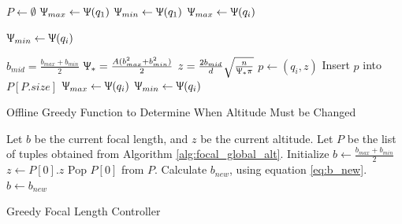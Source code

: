 \documentclass[conference]{IEEEtran}
\theoremstyle{plain}%
\begin{document}
\begin{algorithm}
\begin{algorithmic}[1]

\STATE $P \leftarrow \emptyset$ 
\STATE $\Uppsi_{max} \leftarrow \Uppsi(q_1)$ 
\STATE $\Uppsi_{min} \leftarrow \Uppsi(q_1)$
\STATE $\Uppsi_{max} \leftarrow \Uppsi(q_i)$
\ENDIF

\STATE $\Uppsi_{min} \leftarrow \Uppsi(q_i)$
\ENDIF

\STATE $b_{mid} = \frac{b_{max}+b_{min}}{2}$
\STATE $\Uppsi_* = \frac{A(b_{max}^2+b_{min}^2)}{2}$
\STATE $z = \frac{2b_{mid}}{d} \sqrt{\frac{n}{\Uppsi_*\pi}}$ 
\STATE $p \leftarrow (q_i, z)$
\STATE Insert $p$ into $P[P.size]$
\STATE $\Uppsi_{max} \leftarrow \Uppsi(q_i)$
\STATE $\Uppsi_{min} \leftarrow \Uppsi(q_i)$
\ENDIF

\ENDFOR
\end{algorithmic}
\caption{Offline Greedy Function to Determine When Altitude Must be Changed}
\label{alg:focal_global_alt}
\end{algorithm}

\begin{algorithm}
\begin{algorithmic}[1]

\STATE Let $b$ be the current focal length, and $z$ be the current altitude. Let $P$ be the list of tuples obtained from Algorithm \ref{alg:focal_global_alt}.
\STATE Initialize $b \leftarrow \frac{b_{max}+b_{min}}{2}$
\STATE $z \leftarrow P[0].z$
\STATE Pop $P[0]$ from $P$.
\ENDIF
\STATE Calculate $b_{new}$, using equation \ref{eq:b_new}.
\STATE $b \leftarrow b_{new}$
\ENDFOR

\end{algorithmic}
\caption{Greedy Focal Length Controller}
\label{alg:focal_global}
\end{algorithm}
\end{document}

